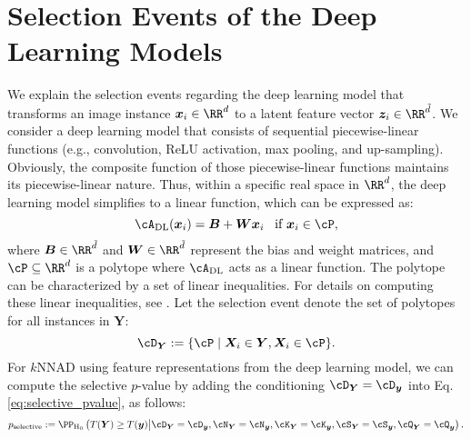 \section{Selection Events of the Deep Learning Models}
\label{app:selection_events_of_dnn}
%
We explain the selection events regarding the deep learning model that transforms an image instance $\bm x_i \in \RR^d$ to a latent feature vector $\bm{z}_i \in \RR^{\tilde{d}}$.
%
We consider a deep learning model that consists of sequential piecewise-linear functions (e.g., convolution, ReLU activation, max pooling, and up-sampling).
% 
Obviously, the composite function of those piecewise-linear functions maintains its piecewise-linear nature.
%
Thus, within a specific real space in $\RR^d$, the deep learning model simplifies to a linear function, which can be expressed as:
%
\begin{equation}
 \cA_{\rm{DL}}(\bm{x}_i) 
 = \bm{B} + \bm{W}\bm{x}_i
 \;\;\; \text{if } \bm{x}_i \in \cP,
\end{equation}
%
where $\bm B \in \RR^{\tilde{d}}$ and $\bm W \in \RR^{\tilde{d}}$ represent the bias and weight matrices, and $\cP \subseteq \RR^d$ is a polytope where $\cA_{\rm{DL}}$ acts as a linear function.
%
The polytope can be characterized by a set of linear inequalities.
%
For details on computing these linear inequalities, see \citet{katsuoka2025si4onnx}.
% 
Let the selection event denote the set of polytopes for all instances in $\bm{Y}$:
%
\begin{equation}
 \cD_{\bm{Y}} := \{\cP \mid \bm{X}_i \in \bm{Y}, \bm{X}_i \in \cP\}.
\end{equation}
% 
For $k$NNAD using feature representations from the deep learning model, we can compute the selective $p$-value by adding the conditioning $\cD_{\bm{Y}} = \cD_{\bm{y}}$ into Eq.\eqref{eq:selective_pvalue}, as follows:
%
\begin{equation}
 p_{\rm selective}
 :=
 \PP_{\rm H_0}
 \left(
 T(\bm Y) \ge T(\bm y)
 \middle|
 \cD_{\bm{Y}} = \cD_{\bm{y}},
 \cN_{\bm{Y}} = \cN_{\bm{y}},
 \cK_{\bm{Y}} = \cK_{\bm{y}},
 \cS_{\bm{Y}} = \cS_{\bm{y}},
 \cQ_{\bm{Y}} = \cQ_{\bm{y}}
 \right).
\end{equation}
